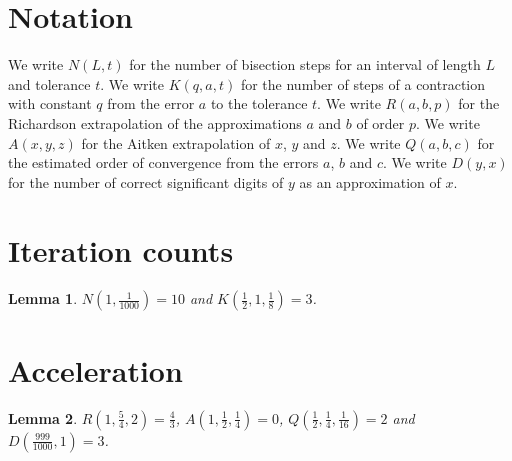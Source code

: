 \documentclass{article}
\newtheorem{lemma}{Lemma}
\begin{document}
\section{Notation}

We write $N(L,t)$ for the number of bisection steps for an interval of length $L$ and tolerance $t$.
We write $K(q,a,t)$ for the number of steps of a contraction with constant $q$ from the error $a$ to the tolerance $t$.
We write $R(a,b,p)$ for the Richardson extrapolation of the approximations $a$ and $b$ of order $p$.
We write $A(x,y,z)$ for the Aitken extrapolation of $x$, $y$ and $z$.
We write $Q(a,b,c)$ for the estimated order of convergence from the errors $a$, $b$ and $c$.
We write $D(y,x)$ for the number of correct significant digits of $y$ as an approximation of $x$.

\section{Iteration counts}

\begin{lemma}\label{counts}
$N(1,\frac{1}{1000})=10$ and $K(\frac12,1,\frac18)=3$.
\end{lemma}

\section{Acceleration}

\begin{lemma}\label{extrapolation}
$R(1,\frac54,2)=\frac43$, $A(1,\frac12,\frac14)=0$, $Q(\frac12,\frac14,\frac{1}{16})=2$ and $D(\frac{999}{1000},1)=3$.
\end{lemma}
\end{document}
